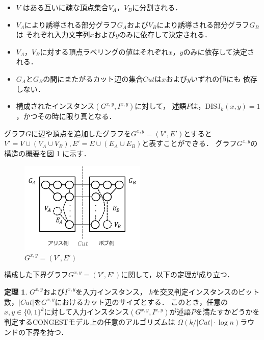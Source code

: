 \documentclass[11pt,a4paper]{jarticle}
\newcommand{\CONGEST}{\textsf{CONGEST}}
\theoremstyle{definition}
\newtheorem{theorem}{定理}[section]
\begin{document}
\begin{itemize}
\item $V$ はある互いに疎な頂点集合$V_A$，$V_B$に分割される．
\item $V_A$により誘導される部分グラフ$G_A$および$V_B$により誘導される部分グラフ$G_B$は
それぞれ入力文字列$x$および$y$のみに依存して決定される．
\item $V_A$，$V_B$に対する頂点ラベリングの値はそれぞれ$x$，$y$のみに依存して決定される．
\item $G_A$と$G_B$の間にまたがるカット辺の集合$\mathit{Cut}$は$x$および$y$いずれの値にも
依存しない．
\item 構成されたインスタンス$(G^{x,y}, I^{x,y})$に対して，
述語$P$は，$\mathrm{DISJ}_{k} (x, y)=1$，かつその時に限り真となる．
\end{itemize}
グラフ$G$に辺や頂点を追加したグラフを$G^{x, y} = (V', E')$とすると
$V' = V \cup (V_{A} \cup V_{B}), E' = E \cup (E_{A} \cup E_{B})$と表すことができる．
グラフ$G^{x, y}$の構造の概要を図 \ref{Gxy} に示す．
\begin{figure}[ht]
\begin{center}
\includegraphics[width=60mm]{Gxy.png}
\end{center}
\caption{$G^{x, y} = (V', E')$}
\label{Gxy}
\end{figure}
構成した下界グラフ$G^{x, y} = (V', E')$に関して，以下の定理が成り立つ．
\begin{theorem}
$G^{x,y}$および$I^{x,y}$を入力インスタンス，
$k$を交叉判定インスタンスのビット数，$|\mathit{Cut}|$を$G^{x, y}$におけるカット辺のサイズとする．
このとき，任意の$x, y \in \{0, 1\}^k$に対して入力インスタンス$(G^{x, y}, I^{x,y})$が述語$P$を満たすかどうかを判定する{\CONGEST}モデル上の任意のアルゴリズムは
$\Omega (k / |\mathit{Cut}| \cdot \log n)$ラウンドの下界を持つ．
\label{lower}
\end{theorem}
\end{document}
